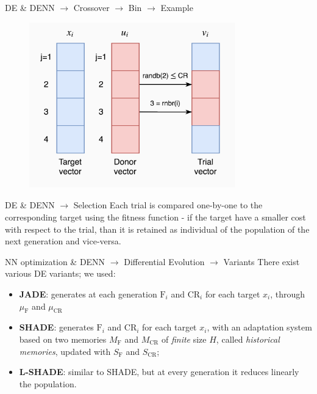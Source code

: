 \documentclass[xcolor={usenames}]{beamer}
\begin{document}
  \begin{frame}{DE \& DENN \(\rightarrow\) Crossover \(\rightarrow\) Bin \(\rightarrow\) Example}
	\begin{figure}
		\centering
		\includegraphics[width=0.8\textwidth]{../figures/bin-4.png}
	\end{figure}
  \end{frame}
  \begin{frame}{DE \& DENN \(\rightarrow\) Selection}
	Each trial is compared one-by-one to the corresponding target using the fitness function - if the target have a smaller cost with respect to the trial, than it is retained as individual of the population of the next generation and vice-versa.
  \end{frame}
  \begin{frame}{NN optimization \& DENN \(\rightarrow\) Differential Evolution \(\rightarrow\) Variants}
  	There exist various DE variants; we used:
  	\begin{itemize}
  		\item{\textbf{JADE}: generates at each generation $\textrm{F}_i$ and $\textrm{CR}_i$ for each target $x_i$, through $\mu_{\textrm{F}}$ and $\mu_{\textrm{CR}}$} 
  		\item{\textbf{SHADE}: generates $\textrm{F}_i$ and $\textrm{CR}_i$ for each target $x_i$, with an adaptation system based on two memories $M_{\textrm{F}}$ and $M_{\textrm{CR}}$ of \textit{finite} size $H$, called \textit{historical memories}, updated with $S_{\textrm{F}}$ and $S_{\textrm{CR}}$;}
  		\item{\textbf{L-SHADE}: similar to SHADE, but at every generation it reduces linearly the population.}
  	\end{itemize}
  \end{frame}
  \fi
  
\end{document}
